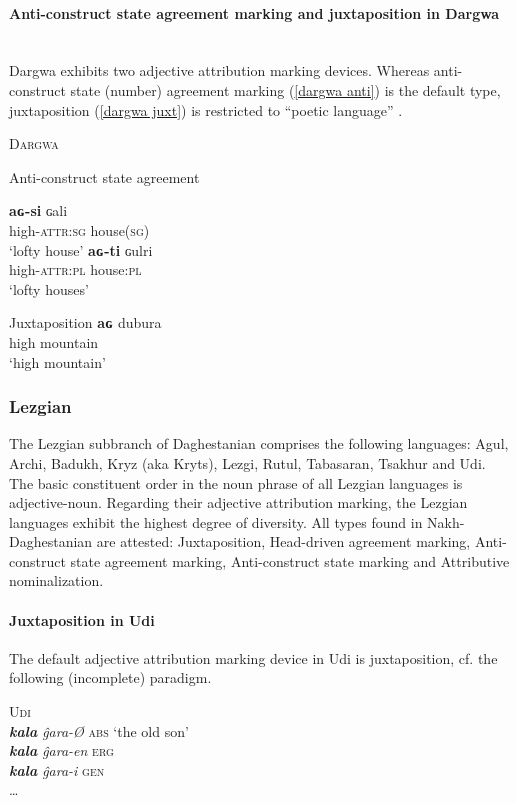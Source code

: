 \paragraph{Anti-construct state agreement marking and juxtaposition in Dargwa}\hspace{1cm}\\
Darg\-wa exhibits two adjective attribution marking devices. Whereas anti-construct state (number) agreement marking (\ref{dargwa anti}) is the default type, juxtaposition (\ref{dargwa juxt}) is restricted to “poetic language” \citep[318]{isaev2004}.
\begin{exe}
\ex \textsc{Dargwa} \citep[318]{isaev2004}
\begin{xlist}
\ex Anti-construct state agreement \label{dargwa anti}
\begin{xlist}
\ex
\gll	\textbf{aɢ-si} ɢali\\
	high-\textsc{attr:sg} house(\textsc{sg})\\
\glt	‘lofty house’
\ex
\gll	\textbf{aɢ-ti} ɢulri\\
	high-\textsc{attr:pl} house:\textsc{pl}\\
\glt	‘lofty houses’
\end{xlist}
\ex Juxtaposition \label{dargwa juxt}
\gll	\textbf{aɢ} dubura\\
	high mountain\\
\glt	‘high mountain’
\end{xlist}
\end{exe}

\subsubsection{Lezgian}\label{lezgian synchr}
The Lezgian subbranch of Daghestanian comprises the following languages: Agul, Archi, Badukh, Kryz (aka Kryts), Lezgi, Rutul, Tabasaran, Tsakhur and Udi.\\

\noindent The basic constituent order in the noun phrase of all Lezgian languages is adjective-noun. Regarding their adjective attribution marking, the Lezgian languages exhibit the highest degree of diversity. All types found in Nakh-Daghestanian are attested: Juxtaposition, Head-driven agreement marking, Anti-construct state agreement marking, Anti-construct state marking and Attributive nominalization.

\paragraph{Juxtaposition in Udi}
The default adjective attribution marking device in Udi is juxtaposition, cf. the following (incomplete) paradigm.
\begin{exe}
\ex \textsc{Udi} \citep[465]{schulze-furhoff1994}\\
\textit{\textbf{kala} ĝara-Ø} \textsc{abs} ‘the old son’\\
\textit{\textbf{kala} ĝara-en} \textsc{erg}\\
\textit{\textbf{kala} ĝara-i} \textsc{gen}\\
\dots
\end{exe}

